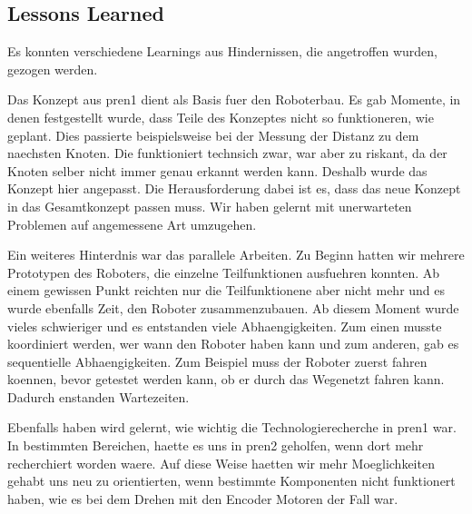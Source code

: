 \subsection{Lessons Learned}

Es konnten verschiedene Learnings aus Hindernissen, die angetroffen wurden, gezogen werden.

Das Konzept aus \acrshort{pren1} dient als Basis fuer den Roboterbau. Es gab Momente, in denen festgestellt wurde, dass Teile des Konzeptes nicht so funktioneren, wie geplant. Dies passierte beispielsweise bei der Messung der Distanz zu dem naechsten Knoten. Die funktioniert technsich zwar, war aber zu riskant, da der Knoten selber nicht immer genau erkannt werden kann. Deshalb wurde das Konzept hier angepasst. Die Herausforderung dabei ist es, dass das neue Konzept in das Gesamtkonzept passen muss. Wir haben gelernt mit unerwarteten Problemen auf angemessene Art umzugehen.

Ein weiteres Hinterdnis war das parallele Arbeiten. Zu Beginn hatten wir mehrere Prototypen des Roboters, die einzelne Teilfunktionen ausfuehren konnten. Ab einem gewissen Punkt reichten nur die Teilfunktionene aber nicht mehr und es wurde ebenfalls Zeit, den Roboter zusammenzubauen. Ab diesem Moment wurde vieles schwieriger und es entstanden viele Abhaengigkeiten. Zum einen musste koordiniert werden, wer wann den Roboter haben kann und zum anderen, gab es sequentielle Abhaengigkeiten. Zum Beispiel muss der Roboter zuerst fahren koennen, bevor getestet werden kann, ob er durch das Wegenetzt fahren kann. Dadurch enstanden Wartezeiten.

Ebenfalls haben wird gelernt, wie wichtig die Technologierecherche in \acrshort{pren1} war. In bestimmten Bereichen, haette es uns in \acrshort{pren2} geholfen, wenn dort mehr recherchiert worden waere. Auf diese Weise haetten wir mehr Moeglichkeiten gehabt uns neu zu orientierten, wenn bestimmte Komponenten nicht funktionert haben, wie es bei dem Drehen mit den Encoder Motoren der Fall war.